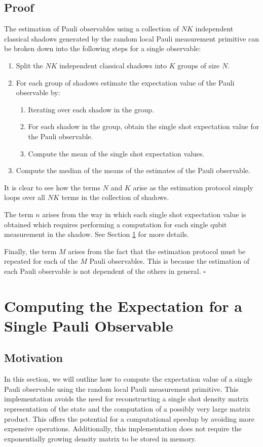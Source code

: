 \documentclass[12pt]{article}
\begin{document}
    \subsection{Proof}
    The estimation of Pauli observables using a collection of $NK$ independent classical shadows generated by the random local Pauli measurement primitive can be broken down into the following steps for a single observable:
    \begin{enumerate}
        \item Split the $NK$ independent classical shadows into $K$ groups of size $N$.
        \item For each group of shadows estimate the expectation value of the Pauli observable by:
        \begin{enumerate}
            \item Iterating over each shadow in the group.
            \item For each shadow in the group, obtain the single shot expectation value for the Pauli observable.
            \item Compute the mean of the single shot expectation values.
        \end{enumerate}
        \item Compute the median of the means of the estimates of the Pauli observable.
    \end{enumerate}

    It is clear to see how the terms $N$ and $K$ arise as the estimation protocol simply loops over all $NK$ terms in the collection of shadows.

    The term $n$ arises from the way in which each single shot expectation value is obtained which requires performing a computation for each single qubit measurement in the shadow. See Section \ref{sec:expectation} for more details.

    Finally, the term $M$ arises from the fact that the estimation protocol must be repeated for each of the $M$ Pauli observables. This is because the estimation of each Pauli observable is not dependent of the others in general. \hfill $\square$ 

    \section{Computing the Expectation for a Single Pauli Observable} \label{sec:expectation}
    \subsection{Motivation}
    In this section, we will outline how to compute the expectation value of a single Pauli observable using the random local Pauli measurement primitive. This implementation avoids the need for reconstructing a single shot density matrix representation of the state and the computation of a possibly very large matrix product. This offers the potential for a computational speedup by avoiding more expensive operations. Additionally, this implementation does not require the exponentially growing density matrix to be stored in memory.
\end{document}
